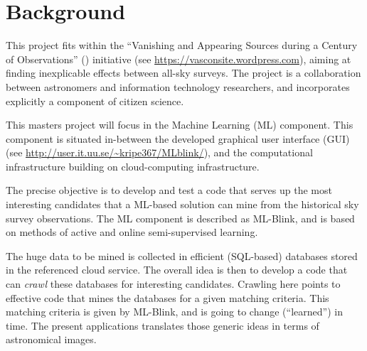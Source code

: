 \section{Background} \label{background}

This project fits within the ``Vanishing and Appearing Sources during a Century of Observations'' (\vasco) initiative (see \url{https://vasconsite.wordpress.com}), aiming at finding inexplicable effects between all-sky surveys. The \vasco project is a collaboration between astronomers and information technology researchers, and incorporates explicitly a component of citizen science.

This masters project will focus in the Machine Learning (ML) component. This component is situated in-between the developed graphical user interface (GUI) (see \url{http://user.it.uu.se/~kripe367/MLblink/}), and the computational infrastructure building on cloud-computing infrastructure.

The precise objective is to develop and test a code that serves up the most interesting candidates that a ML-based solution can mine from the historical sky survey observations. The ML component is described as ML-Blink, and is based on methods of active and online semi-supervised learning.

The huge data to be mined is collected in efficient (SQL-based) databases stored in the referenced cloud service. The overall idea is then to develop a code that can {\em crawl} these databases for interesting candidates. Crawling here points to effective code that mines the databases for a given matching criteria. This matching criteria is given by ML-Blink, and is going to change (``learned'') in time. The present applications translates those generic ideas in terms of astronomical images.